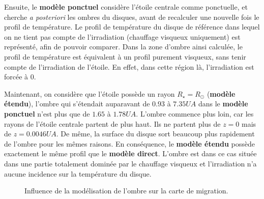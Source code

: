 Ensuite, le \textbf{modèle ponctuel} considère l'étoile centrale comme ponctuelle, et cherche \textit{a posteriori} les ombres du disques, avant de recalculer une nouvelle fois le profil de température. Le profil de température du disque de référence dans lequel on ne tient pas compte de l'irradiation (chauffage visqueux uniquement) est représenté, afin de pouvoir comparer. Dans la zone d'ombre ainsi calculée, le profil de température est équivalent à un profil purement visqueux, sans tenir compte de l'irradiation de l'étoile. En effet, dans cette région là, l'irradiation est forcée à 0. 

Maintenant, on considère que l'étoile possède un rayon $R_\star=R_\odot$ (\textbf{modèle étendu}), l'ombre qui s'étendait auparavant de $0.93$ à $7.35\unit{UA}$ dans le \textbf{modèle ponctuel} n'est plus que de $1.65$ à $1.78\unit{UA}$. L'ombre commence plus loin, car les rayons de l'étoile centrale partent de plus haut. Ils ne partent plus de $z=0$ mais de $z=0.0046\unit{UA}$. De même, la surface du disque sort beaucoup plus rapidement de l'ombre pour les mêmes raisons. En conséquence, le \textbf{modèle étendu} possède exactement le même profil que le \textbf{modèle direct}. L'ombre est dans ce cas située dans une partie totalement dominée par le chauffage visqueux et l'irradiation n'a aucune incidence sur la température du disque. 

\begin{figure}[htbp]
\centering
{}\hfill
{}

\caption{Influence de la modélisation de l'ombre sur la carte de migration.  }\label{fig:map_shadow_effect}
\end{figure}

